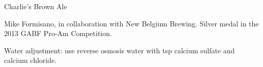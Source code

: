 \begin{recipe}{Charlie's Brown Ale}

\begin{aboutblock}
Mike Formisano, in collaboration with New Belgium Brewing. Silver medal in the
2013 GABF Pro-Am Competition. \sourceaha
\end{aboutblock}


\begin{methodandtiming}

\begin{mashsteps}
\end{mashsteps}

\begin{fermentationsteps}
\end{fermentationsteps}

\begin{directions}
Water adjustment: use reverse osmosis water with  tsp calcium sulfate
and  calcium chloride.
\end{directions}

\end{methodandtiming}

\recipebreak

\begin{ingredientsblock}

\begin{malts}
\end{malts}

\begin{hops}
\end{hops}


\end{ingredientsblock}

\end{recipe}


